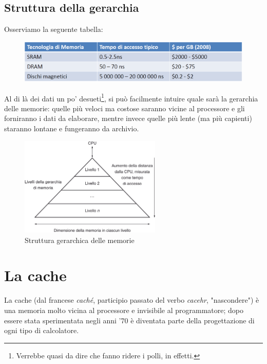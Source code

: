 \documentclass[class=book, crop=false, oneside]{standalone}
\begin{document}
\subsection{Struttura della gerarchia}
Osserviamo la seguente tabella:
\begin{figure}[H]
	\centering
	\includegraphics[width=\textwidth,keepaspectratio]{tabella_polli.png}
\end{figure}
Al di là dei dati un po' desueti\footnote{Verrebbe quasi da dire che fanno ridere i polli, in effetti.}, si può facilmente intuire quale sarà la gerarchia delle memorie: quelle più veloci ma costose saranno vicine al processore e gli forniranno i dati da elaborare, mentre invece quelle più lente (ma più capienti) staranno lontane e fungeranno da archivio.
\begin{figure}[H]
	\centering
	\includegraphics[width=0.6\textwidth,keepaspectratio]{strut-ger.png}
	\caption{Struttura gerarchica delle memorie}
\end{figure}

\section{La cache}
La cache (dal francese \emph{caché}, participio passato del verbo \emph{cacehr}, "nascondere") è una memoria molto vicina al processore e invisibile al programmatore; dopo essere stata sperimentata negli anni '70 è diventata parte della progettazione di ogni tipo di calcolatore.
\end{document}
